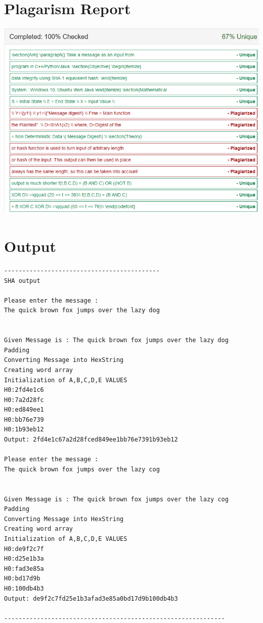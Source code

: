 \documentclass[a4paper,12pt]{article}
\begin{document}
\section{Plagarism Report}
\includegraphics[width=\textwidth]{sha}
\section{Output}
\begin{verbatim}
-------------------------------------------
SHA output

Please enter the message : 
The quick brown fox jumps over the lazy dog


Given Message is : The quick brown fox jumps over the lazy dog
Padding
Converting Message into HexString
Creating word array
Initialization of A,B,C,D,E VALUES
H0:2fd4e1c6
H0:7a2d28fc
H0:ed849ee1
H0:bb76e739
H0:1b93eb12
Output: 2fd4e1c67a2d28fced849ee1bb76e7391b93eb12

Please enter the message : 
The quick brown fox jumps over the lazy cog


Given Message is : The quick brown fox jumps over the lazy cog
Padding
Converting Message into HexString
Creating word array
Initialization of A,B,C,D,E VALUES
H0:de9f2c7f
H0:d25e1b3a
H0:fad3e85a
H0:bd17d9b
H0:100db4b3
Output: de9f2c7fd25e1b3afad3e85a0bd17d9b100db4b3

-------------------------------------------------------------

\end{verbatim}
\end{document}
